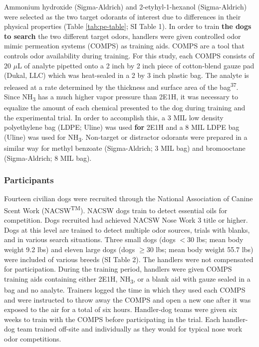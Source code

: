 \documentclass[
]{article}
\begin{document}
Ammonium hydroxide (Sigma-Aldrich) and 2-etyhyl-1-hexanol (Sigma-Aldrich) were selected as the two target odorants of interest due to differences in their physical properties (Table \ref{tab:pe-table}; SI Table 1). In order to train \textbf{the dogs to search} the two different target odors, handlers were given controlled odor mimic permeation systems (COMPS) as training aids. COMPS are a tool that controls odor availability during training. For this study, each COMPS consists of 20 \(\mu\)L of analyte pipetted onto a 2 inch by 2 inch piece of cotton-blend gauze pad (Dukal, LLC) which was heat-sealed in a 2 by 3 inch plastic bag. The analyte is released at a rate determined by the thickness and surface area of the bag\textsuperscript{37}. Since NH\textsubscript{3} has a much higher vapor pressure than 2E1H, it was necessary to equalize the amount of each chemical presented to the dog during training and the experimental trial. In order to accomplish this, a 3 MIL low density polyethylene bag (LDPE; Uline) was used \textbf{for} 2E1H and a 8 MIL LDPE bag (Uline) was used for NH\textsubscript{3}. Non-target or distractor odorants were prepared in a similar way for methyl benzoate (Sigma-Aldrich; 3 MIL bag) and bromooctane (Sigma-Aldrich; 8 MIL bag).

\hypertarget{participants}{%
\subsubsection{Participants}\label{participants}}

Fourteen civilian dogs were recruited through the National Association of Canine Scent Work (NACSW\textsuperscript{TM}). NACSW dogs train to detect essential oils for competition. Dogs recruited had achieved NACSW Nose Work 3 title or higher. Dogs at this level are trained to detect multiple odor sources, trials with blanks, and in various search situations. Three small dogs (dogs \(< 30\) lbs; mean body weight 9.2 lbs) and eleven large dogs (dogs \(\geq 30\) lbs; mean body weight 55.7 lbs) were included of various breeds (SI Table 2). The handlers were not compensated for participation. During the training period, handlers were given COMPS training aids containing either 2E1H, NH\textsubscript{3}, or a blank aid with gauze sealed in a bag and no analyte. Trainers logged the time in which they used each COMPS and were instructed to throw away the COMPS and open a new one after it was exposed to the air for a total of six hours. Handler-dog teams were given six weeks to train with the COMPS before participating in the trial. Each handler-dog team trained off-site and individually as they would for typical nose work odor competitions.
\end{document}
